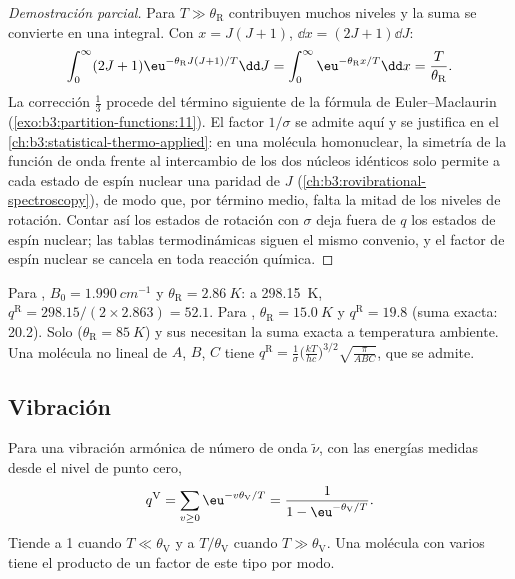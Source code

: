 \begin{proof}[Demostración parcial]
Para $T \gg \theta_{\mathrm R}$ contribuyen muchos niveles y la suma se convierte en una integral.
Con $x = J(J+1)$, $\dd x = (2J+1)\dd J$:
\[
  \int_0^\infty(2J+1)\eu^{-\theta_{\mathrm R}J(J+1)/T}\dd J = \int_0^\infty\eu^{-\theta_{\mathrm R}x/T}\dd x
  = \frac{T}{\theta_{\mathrm R}}.
\]
La corrección $\frac13$ procede del término siguiente de la fórmula de Euler--Maclaurin
(\cref{exo:b3:partition-functions:11}). El factor $1/\sigma$ se admite aquí y se
justifica en el \cref{ch:b3:statistical-thermo-applied}: en una molécula homonuclear,
la simetría de la función de onda frente al intercambio de los dos núcleos idénticos
solo permite a cada estado de espín nuclear una paridad de $J$
(\cref{ch:b3:rovibrational-spectroscopy}), de modo que, por término medio, falta la mitad de los
niveles de rotación. Contar así los estados de rotación con $\sigma$
deja fuera de $q$ los estados de espín nuclear; las tablas termodinámicas siguen el
mismo convenio, y el factor de espín nuclear se cancela en toda reacción
química.
\end{proof}

Para , $B_0 = \qty{1.990}{cm^{-1}}$ y $\theta_{\mathrm R} = \qty{2.86}{K}$: a \qty{298.15}{K},
$q^{\mathrm R} = 298.15/(2\times2.863) = 52.1$. Para , $\theta_{\mathrm R} = \qty{15.0}{K}$ y
$q^{\mathrm R} = 19.8$ (suma exacta: 20.2). Solo  ($\theta_{\mathrm R} = \qty{85}{K}$) y sus 
necesitan la suma exacta a temperatura ambiente. Una molécula no lineal de 
$A$, $B$, $C$ tiene $q^{\mathrm R} = \frac{1}{\sigma}\bigl(\frac{kT}{hc}\bigr)^{3/2}\sqrt{\frac{\pi}{ABC}}$, que se admite.

\subsection*{Vibración}

\begin{proposition}\label{prop:b3:partition-functions:q-vib}
Para una vibración armónica de número de onda $\tilde\nu$, con las energías medidas desde el
nivel de punto cero,
\[
  q^{\mathrm V} = \sum_{v\ge0}\eu^{-v\theta_{\mathrm V}/T} = \frac{1}{1 - \eu^{-\theta_{\mathrm V}/T}} .
\]
Tiende a 1 cuando $T \ll \theta_{\mathrm V}$ y a $T/\theta_{\mathrm V}$ cuando $T \gg \theta_{\mathrm V}$. Una molécula
con varios  tiene el producto de un factor de este tipo por modo.
\end{proposition}

